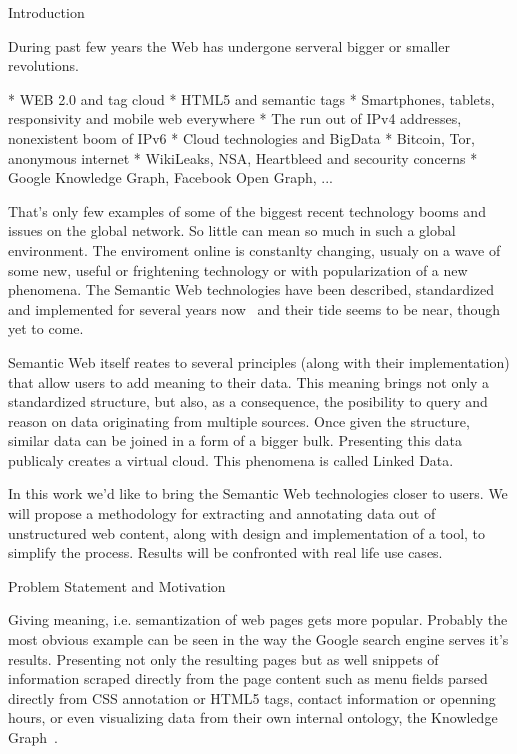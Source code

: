 \chap Introduction

During past few years the Web has undergone serveral bigger or smaller
revolutions. 

\begitems
  * WEB 2.0 and tag cloud
  * HTML5 and semantic tags
  * Smartphones, tablets, responsivity and mobile web everywhere
  * The run out of IPv4 addresses, nonexistent boom of IPv6
  * Cloud technologies and BigData
  * Bitcoin, Tor, anonymous internet 
  * WikiLeaks, NSA, Heartbleed and secourity concerns
  * Google Knowledge Graph, Facebook Open Graph, ...
\enditems

That's only few examples of some of the biggest recent technology booms and
issues on the global network. So little can mean so much in such a global
environment. The enviroment online is constanlty changing, usualy on a wave
of some new, useful or frightening technology or with popularization of a new
phenomena. The Semantic Web technologies have been described, standardized and
implemented for several years now~ and their tide seems to be near,
though yet to come.

Semantic Web itself reates to several principles (along with their
implementation) that allow users to add meaning to their data. This meaning
brings not only a standardized structure, but also, as a consequence, the
posibility to query and reason on data originating from multiple sources. Once
given the structure, similar data can be joined in a form of a bigger bulk.
Presenting this data publicaly creates a virtual cloud. This phenomena is
called Linked Data. 

In this work we'd like to bring the Semantic Web technologies closer to users.
We will propose a methodology for extracting and annotating data out of
unstructured web content, along with design and implementation of a tool, to
simplify the process. Results will be confronted with real life use cases. 


\sec Problem Statement and Motivation


Giving meaning, i.e. semantization of web pages gets more popular. Probably the
most obvious example can be seen in the way the Google search engine serves
it's results. Presenting not only the resulting pages but as well snippets of
information scraped directly from the page content such as menu fields parsed
directly from CSS annotation or HTML5 tags, contact information or openning
hours, or even visualizing data from their own internal ontology, the Knowledge
Graph~. 

